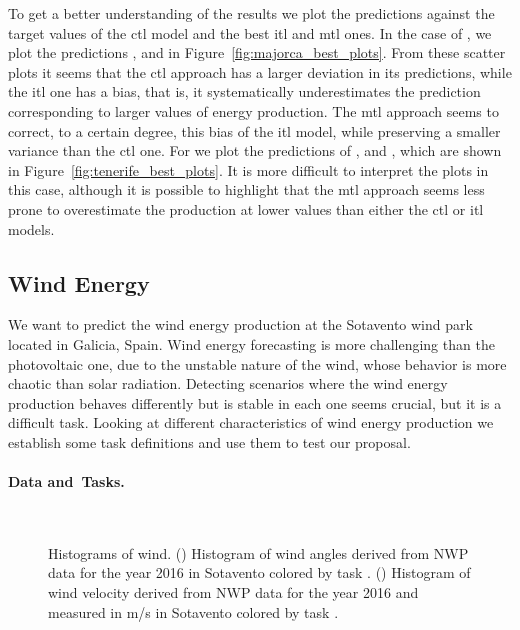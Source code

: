 %
To get a better understanding of the results we plot the predictions against the target values of the \acrshort{ctl} model and the best \acrshort{itl} and \acrshort{mtl} ones.
%
In the case of , we plot the predictions ,  and  in Figure~\ref{fig:majorca_best_plots}.
From these scatter plots it seems that the \acrshort{ctl} approach has a larger deviation in its predictions, while the \acrshort{itl} one has a bias, that is, it systematically underestimates the prediction corresponding to larger values of energy production.
The \acrshort{mtl} approach seems to correct, to a certain degree, this bias of the \acrshort{itl} model, while preserving a smaller variance than the \acrshort{ctl} one.
%
For  we plot the predictions of ,  and , which are shown in Figure~\ref{fig:tenerife_best_plots}.
It is more difficult to interpret the plots in this case, although it is possible to highlight that the \acrshort{mtl} approach seems less prone to overestimate the production at lower values than either the \acrshort{ctl} or \acrshort{itl} models.








\subsection{Wind Energy}
We want to predict the wind energy production at the Sotavento wind park located in Galicia, Spain.
Wind energy forecasting is more challenging than the photovoltaic one, due to the unstable nature of the wind, whose behavior is more chaotic than solar radiation. Detecting scenarios where the wind energy production behaves differently but is stable in each one seems crucial, but it is a difficult task. Looking at different characteristics of wind energy production we establish some task definitions and use them to test our proposal. 

\paragraph*{Data and~Tasks.\\}

\begin{figure}[t!]
    \centering%
    \quad%
    \\
 \caption{\label{fig:wind_task_def} Histograms of wind. (\protect{}) {Histogram} %
  of wind angles derived from NWP data for the year 2016 in Sotavento colored by task . (\protect{})  Histogram of wind velocity derived from NWP data for the year 2016 and measured in m/s in Sotavento colored by {task} .}
\end{figure}

